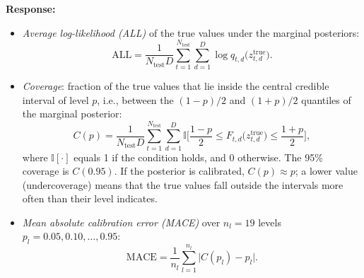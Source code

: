 \documentclass[11pt]{article}
\newenvironment{response}{\par\smallskip\noindent\color{resp}\textbf{Response:}\ }{\par}
\begin{document}
\begin{response}
\begin{itemize}[leftmargin=*]
\begin{equation}
	\end{equation}
	\item \emph{Average log-likelihood (ALL)} of the true values under the marginal posteriors:
	\begin{equation}
		\mathrm{ALL}=\frac{1}{N_{\text{test}}D}\sum_{t=1}^{N_{\text{test}}}\sum_{d=1}^{D}\log q_{t,d}\big(z^{\text{true}}_{t,d}\big).
		\label{eq:all}
	\end{equation}
	\item \emph{Coverage}: fraction of the true values that lie inside the central credible interval of level $p$, i.e.,
	between the $(1-p)/2$ and $(1+p)/2$ quantiles of the marginal posterior:
	\begin{equation}
		C(p)=\frac{1}{N_{\text{test}}D}\sum_{t=1}^{N_{\text{test}}}\sum_{d=1}^{D}\mathbb{I}\Big[\frac{1-p}{2}\le F_{t,d}\big(z^{\text{true}}_{t,d}\big)\le\frac{1+p}{2}\Big],
		\label{eq:coverage}
	\end{equation}
	where $\mathbb{I}[\cdot]$ equals 1 if the condition holds, and 0 otherwise. The 95\% coverage is $C(0.95)$. If the
	posterior is calibrated, $C(p)\approx p$; a lower value (undercoverage) means that the true values fall outside the
	intervals more often than their level indicates.
	\item \emph{Mean absolute calibration error (MACE)} over $n_l=19$ levels $p_l=0.05,0.10,\dots,0.95$:
	\begin{equation}
		\mathrm{MACE}=\frac{1}{n_l}\sum_{l=1}^{n_l}\big|C(p_l)-p_l\big|.
		\label{eq:mace}
	\end{equation}
\end{itemize}


\end{response}
\end{document}
